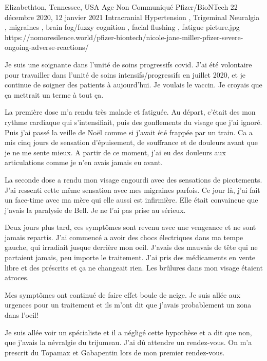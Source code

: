           {Elizabethton, Tennessee, USA}
          {Age Non Communiqué}
          {Pfizer/BioNTech}
          {22 décembre 2020, 12 janvier 2021}
          {
            Intracranial Hypertension
            , Trigeminal Neuralgia
            , migraines
            , brain fog/fuzzy cognition
            , facial flushing
            , fatigue
          }
          {picture.jpg}
          {https://nomoresilence.world/pfizer-biontech/nicole-jane-miller-pfizer-severe-ongoing-adverse-reactions/}
          {

Je suis une soignante dans l'unité de soins progressifs covid. J'ai été
volontaire pour travailler dans l'unité de soins intensifs/progressifs en
juillet 2020, et je continue de soigner des patients à aujourd'hui. Je voulais
le vaccin. Je croyais que ça mettrait un terme à tout ça.

La première dose m'a rendu très malade et fatiguée. Au départ, c'était des mon
rythme cardiaque qui s'intensifiait, puis des gonflements du visage que j'ai
ignoré. Puis j'ai passé la veille de Noël comme si j'avait été frappée par un
train. Ca a mis cinq jours de sensation d'épuisement, de souffrance et de
douleurs avant que je ne me sente mieux. A partir de ce moment, j'ai eu des
douleurs aux articulations comme je n'en avais jamais eu avant.

La seconde dose a rendu mon visage engourdi avec des sensations de
picotements. J'ai ressenti cette même sensation avec mes migraines parfois. Ce
jour là, j'ai fait un face-time avec ma mère qui elle aussi est infirmière. Elle
était convaincue que j'avais la paralysie de Bell. Je ne l'ai pas prise au
sérieux.

Deux jours plus tard, ces symptômes sont revenu avec une vengeance et ne sont
jamais repartis. J'ai commencé a avoir des chocs électriques dans ma tempe
gauche, qui irradiait jusque derrière mon oeil. J'avais des mauvais de tête qui
ne partaient jamais, peu importe le traitement. J'ai pris des médicaments en
vente libre et des préscrits et ça ne changeait rien. Les brûlures dans mon
visage étaient atroces.

Mes symptômes ont continué de faire effet boule de neige. Je suis allée aux
urgences pour un traitement et ils m'ont dit que j'avais probablement un zona
dans l'oeil!

Je suis allée voir un spécialiste et il a négligé cette hypothèse et a dit que
non, que j'avais la névralgie du trijumeau. J'ai dû attendre un rendez-vous. On
m'a prescrit du Topamax et Gabapentin lors de mon premier rendez-vous.

}
